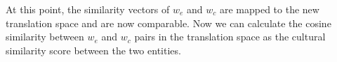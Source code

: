 %

At this point, the similarity vectors of $w_e$ and $w_c$
are mapped to the new translation space and are now comparable.
Now we can calculate the cosine similarity between $w_e$ and $w_c$
pairs in the translation space as the cultural similarity score
between the two entities.

%
%
